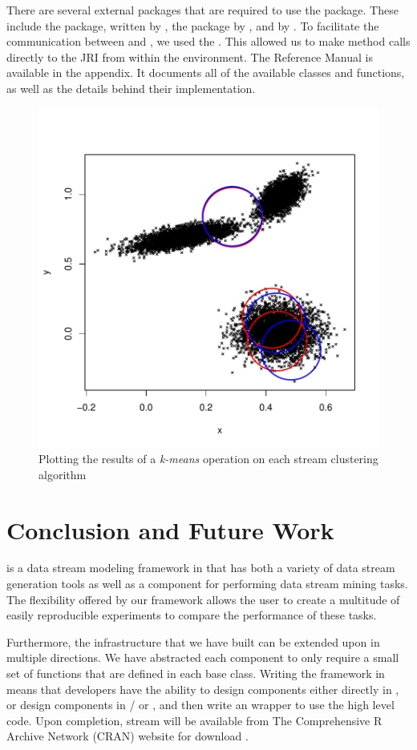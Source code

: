 \documentclass[nojss]{jss}
\begin{document}
There are several external packages that are required to use the  package. These include the  package, written by \cite{stream:Meyer+Buchta:2010}, the  package by \cite{stream:Venables+Ripley:2002}, and  by \cite{stream:Qiu+Joe:2009}. To facilitate the communication between  and , we used the  \citep{stream:Urbanek:2010}. This allowed us to make method calls directly to the JRI from within the  environment. The  Reference Manual is available in the appendix. It documents all of the available classes and functions, as well as the details behind their implementation.

\begin{figure}
\centering
\includegraphics[width=.5\linewidth]{stream-plot4}
\caption{Plotting the results of a \textit{k-means} operation on each stream clustering algorithm}
\label{figure:plot4}
\end{figure}

\section{Conclusion and Future Work}
\label{sec:conclusion}

 is a data stream modeling framework in  that has both a variety of data stream generation tools as well as a component for performing data stream mining tasks. The flexibility offered by our framework allows the user to create a multitude of easily reproducible experiments to compare the performance of these tasks.


Furthermore, the infrastructure that we have built can be extended upon in multiple directions. We have abstracted each component to only require a small set of functions that are defined in each base class. Writing the framework in  means that developers have the ability to design components either directly in , or design components in / or , and then write an  wrapper to use the high level code. Upon completion, stream will be available from The Comprehensive R Archive Network (CRAN) website for download \citep{stream:cran:2010}.
\end{document}
